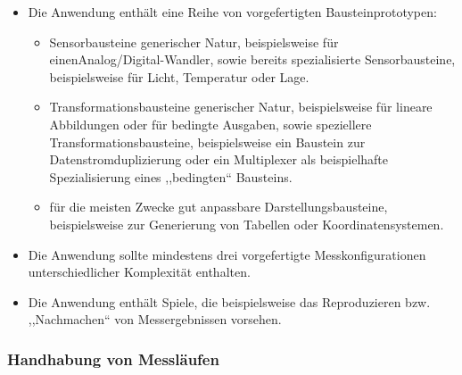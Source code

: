 \documentclass[parskip=full]{scrartcl}
\begin{document}
\begin{itemize}
	
	\item Die Anwendung enthält eine Reihe von vorgefertigten Bausteinprototypen: 
	\begin{itemize}
		
		\item 
		\begin{MussKrit} 		
			Sensorbausteine generischer Natur, beispielsweise für einen\newline Analog/Digital-Wandler, sowie bereits spezialisierte Sensorbausteine, beispielsweise für Licht, Temperatur oder Lage.	
		\end{MussKrit} 
		
		\item 
		\begin{MussKrit} 		
			Transformationsbausteine generischer Natur, beispielsweise für lineare Abbildungen oder für bedingte Ausgaben, sowie speziellere Transformationsbausteine, beispielsweise ein Baustein zur Datenstromduplizierung oder ein Multiplexer als beispielhafte Spezialisierung eines ,,bedingten`` Bausteins. 
				
		\end{MussKrit}
		
		\item 
		\begin{MussKrit} 	
			für die meisten Zwecke gut anpassbare Darstellungsbausteine, beispielsweise zur Generierung von Tabellen oder Koordinatensystemen.					
		\end{MussKrit}
	\end{itemize}
	
	\item 
	\begin{SollKrit} 
		Die Anwendung sollte mindestens drei vorgefertigte Messkonfigurationen unterschiedlicher Komplexität enthalten. 			
	\end{SollKrit}

	\item
	\begin{WunschKrit}
		Die Anwendung enthält Spiele, die beispielsweise das Reproduzieren bzw. ,,Nachmachen`` von Messergebnissen vorsehen.
	\end{WunschKrit}

	
\end{itemize}


\subsubsection{Handhabung von Messläufen}
\end{document}
